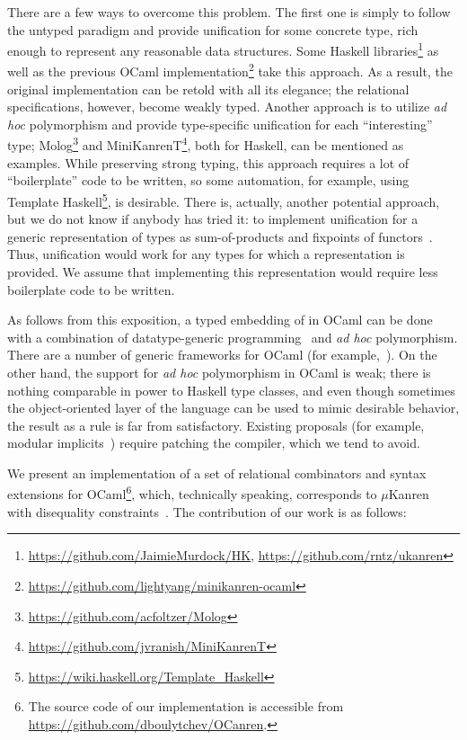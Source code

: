 There are a few ways to overcome this problem. The first one is simply to follow the untyped paradigm and
provide unification for some concrete type, rich enough to represent any reasonable data structures.
Some Haskell \miniKanren libraries\footnote{\url{https://github.com/JaimieMurdock/HK}, \url{https://github.com/rntz/ukanren}}
as well as the previous OCaml implementation\footnote{\url{https://github.com/lightyang/minikanren-ocaml}} take this approach. 
As a result, the original implementation can be retold with all its elegance; the relational specifications, however,
become weakly typed. Another approach is to utilize \emph{ad hoc} polymorphism and provide type-specific
unification for each ``interesting'' type; Molog\footnote{\url{https://github.com/acfoltzer/Molog}} and 
MiniKanrenT\footnote{\url{https://github.com/jvranish/MiniKanrenT}}, both for Haskell, can be mentioned as examples.
While preserving strong typing, this approach requires a lot of ``boilerplate'' code to be written, so some
automation, for example, using Template Haskell\footnote{\url{https://wiki.haskell.org/Template_Haskell}},
is desirable. There is, actually, another potential approach, but we do not know if anybody has tried
it: to implement unification for a generic representation of types as sum-of-products and fixpoints of 
functors~\cite{InstantGenerics, ALaCarte}. Thus, unification would work for any types for which a representation
is provided. We assume that implementing this representation would require less boilerplate code to be written.

As follows from this exposition, a typed embedding of \miniKanren in OCaml can be done with
a combination of datatype-generic programming~\cite{DGP} and \emph{ad hoc} polymorphism. There are a 
number of generic frameworks for OCaml (for example,~\cite{Deriving}). On the other hand, the support
for \emph{ad hoc} polymorphism in OCaml is weak; there is nothing comparable in power to Haskell 
type classes, and even though sometimes the object-oriented layer of the language can be used to mimic
desirable behavior, the result as a rule is far from satisfactory. Existing proposals (for example, 
modular implicits~\cite{Implicits}) require patching the compiler, which we tend to avoid.

We present an implementation of a set of relational combinators and syntax extensions for 
OCaml\footnote{The source code of our implementation is accessible from \url{https://github.com/dboulytchev/OCanren}.}, 
which, technically speaking, corresponds to $\mu$Kanren~\cite{MicroKanren} with disequality 
constraints~\cite{CKanren}. The contribution of our work is as follows:

